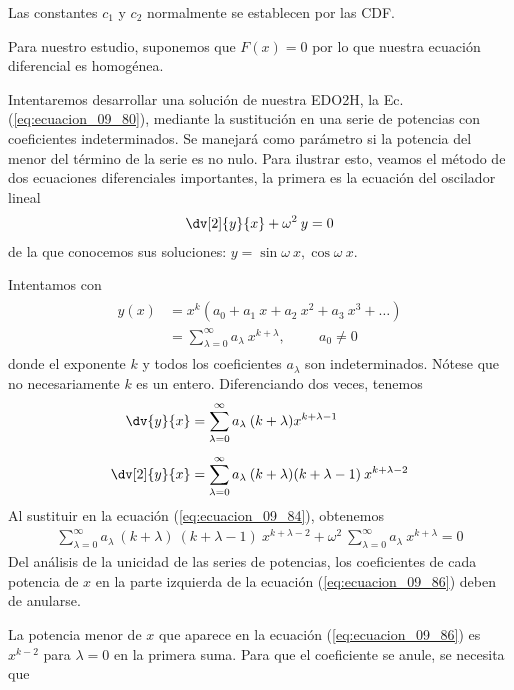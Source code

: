 Las constantes $c_{1}$ y $c_{2}$ normalmente se establecen por las CDF.
\par
Para nuestro estudio, suponemos que $F(x) = 0$ por lo que nuestra ecuación diferencial es homogénea.
\par
Intentaremos desarrollar una solución de nuestra EDO2H, la Ec. (\ref{eq:ecuacion_09_80}), mediante la sustitución en una serie de potencias con coeficientes indeterminados. Se manejará como parámetro si la potencia del menor del término de la serie es no nulo. Para ilustrar esto, veamos el método de dos ecuaciones diferenciales importantes, la primera es la ecuación del oscilador lineal
\begin{align}
\dv[2]{y}{x} + \omega^{2} \: y = 0
\label{eq:ecuacion_09_84}
\end{align}
de la que conocemos sus soluciones: $y= \sin \omega \: x, \cos \omega \: x$.
\par
Intentamos con
\begin{align}
\begin{aligned}
y(x) &= x^{k} (a_{0} + a_{1} \: x + a_{2} \: x^{2} + a_{3} \: x^{3} + \ldots ) \\
&= \sum_{\lambda = 0}^{\infty} a_{\lambda} \: x^{k + \lambda}, \hspace{1cm} a_{0} \neq 0
\end{aligned}
\label{eq:ecuacion_09_85}
\end{align}
donde el exponente $k$ y todos los coeficientes $a_{\lambda}$ son indeterminados. Nótese que no necesariamente $k$ es un entero. Diferenciando dos veces, tenemos
\begin{align*}
\dv{y}{x} &= \sum_{\lambda=0}^{\infty} a_{\lambda} \: (k + \lambda) x^{k + \lambda - 1} \\[0.5em]
\dv[2]{y}{x} &= \sum_{\lambda=0}^{\infty} a_{\lambda} \: (k + \lambda) (k + \lambda - 1) \: x^{k + \lambda - 2}
\end{align*}
Al sustituir en la ecuación (\ref{eq:ecuacion_09_84}), obtenemos
\begin{align}
\sum_{\lambda=0}^{\infty} a_{\lambda} \: (k + \lambda) \: (k + \lambda - 1) \: x^{k + \lambda - 2} + \omega^{2} \: \sum_{\lambda = 0}^{\infty} a_{\lambda} \: x^{k + \lambda} = 0
\label{eq:ecuacion_09_86}
\end{align}
Del análisis de la unicidad de las series de potencias, los coeficientes de cada potencia de $x$ en la parte izquierda de la ecuación (\ref{eq:ecuacion_09_86}) deben de anularse.
\par
La potencia menor de $x$ que aparece en la ecuación (\ref{eq:ecuacion_09_86}) es $x^{k - 2}$ para $\lambda = 0$ en la primera suma. Para que el coeficiente se anule, se necesita que
